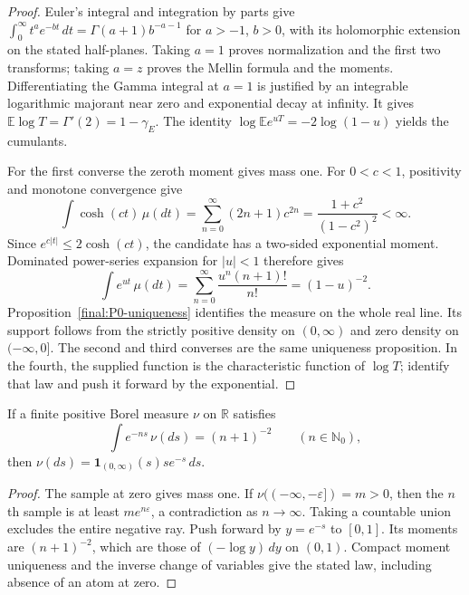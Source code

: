 \begin{proof}
Euler's integral and integration by parts give
$\int_0^\infty t^a e^{-bt}\,dt=\Gamma(a+1)b^{-a-1}$
for $a>-1$, $b>0$, with its holomorphic extension on the stated
half-planes.  Taking $a=1$ proves normalization and the first two
transforms; taking $a=z$ proves the Mellin formula and the moments.
Differentiating the Gamma integral at $a=1$ is justified by an
integrable logarithmic majorant near zero and exponential decay at
infinity.  It gives $\mathbb E\log T=\Gamma'(2)=1-\gamma_E$.
The identity $\log\mathbb E e^{uT}=-2\log(1-u)$ yields the cumulants.

For the first converse the zeroth moment gives mass one.  For
$0<c<1$, positivity and monotone convergence give
\[
 \int\cosh(ct)\,\mu(dt)
 =\sum_{n=0}^\infty(2n+1)c^{2n}
 =\frac{1+c^2}{(1-c^2)^2}<\infty.
\]
Since $e^{c|t|}\leq2\cosh(ct)$, the candidate has a two-sided
exponential moment.  Dominated power-series expansion for $|u|<1$
therefore gives
\[
 \int e^{ut}\,\mu(dt)
 =\sum_{n=0}^\infty\frac{u^n(n+1)!}{n!}
 =(1-u)^{-2}.
\]
Proposition~\ref{final:P0-uniqueness} identifies the measure on the
whole real line.  Its support follows from the strictly positive
density on $(0,\infty)$ and zero density on $(-\infty,0]$.
The second and third converses are the same uniqueness proposition.
In the fourth, the supplied function is the characteristic function
of $\log T$; identify that law and push it forward by the exponential.
\end{proof}

\begin{proposition}
\label{final:P1-samples}
If a finite positive Borel measure $\nu$ on $\mathbb R$ satisfies
\[
 \int e^{-ns}\,\nu(ds)=(n+1)^{-2}\qquad(n\in\mathbb N_0),
\]
then $\nu(ds)=\mathbf 1_{(0,\infty)}(s)s e^{-s}\,ds$.
\end{proposition}
\begin{proof}
The sample at zero gives mass one.  If
$\nu(( -\infty,-\varepsilon])=m>0$, then the $n$th sample is
at least $m e^{n\varepsilon}$, a contradiction as $n\to\infty$.
Taking a countable union excludes the entire negative ray.
Push forward by $y=e^{-s}$ to $[0,1]$.  Its moments are
$(n+1)^{-2}$, which are those of $(-\log y)\,dy$ on $(0,1)$.
Compact moment uniqueness and the inverse change of variables give
the stated law, including absence of an atom at zero.
\end{proof}

